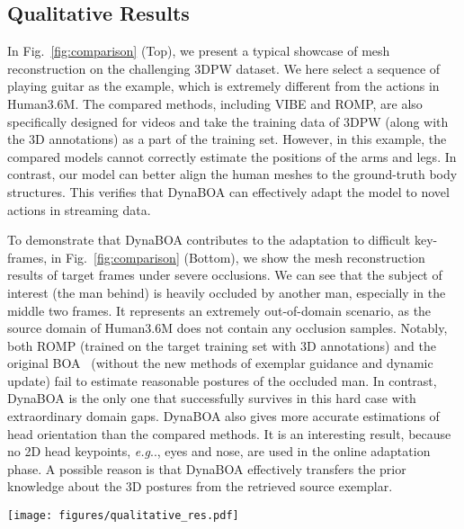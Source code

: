 \documentclass[10pt,journal,compsoc]{IEEEtran}
\makeatletter
\let\MYoriglatexcaption\caption
\renewcommand{\caption}[2][\relax]{\MYoriglatexcaption[#2]{#2}}
\DeclareRobustCommand\onedot{\futurelet\@let@token\@onedot}
\def\@onedot{\ifx\@let@token.\else.\null\fi\xspace}
\def\eg{\emph{e.g}\onedot} \def\Eg{\emph{E.g}\onedot}
\def\ie{\emph{i.e}\onedot} \def\Ie{\emph{I.e}\onedot}
\newcommand{\fig}[1]{Fig.~\ref{#1}}
\makeatother
\begin{document}
\subsection{Qualitative Results}

In \fig{fig:comparison} (Top), we present a typical showcase of mesh reconstruction on the challenging 3DPW dataset. We here select a sequence of playing guitar as the example, which is extremely different from the actions in Human3.6M. 
The compared methods, including VIBE and ROMP, are also specifically designed for videos and take the training data of 3DPW (along with the 3D annotations) as a part of the training set. 
However, in this example, the compared models cannot correctly estimate the positions of the arms and legs. In contrast, our model can better align the human meshes to the ground-truth body structures. 
This verifies that DynaBOA can effectively adapt the model to novel actions in streaming data. 


To demonstrate that DynaBOA contributes to the adaptation to difficult key-frames, in \fig{fig:comparison} (Bottom), we show the mesh reconstruction results of target frames under severe occlusions. We can see that the subject of interest (the man behind) is heavily occluded by another man, especially in the middle two frames.
It represents an extremely out-of-domain scenario, as the source domain of Human3.6M does not contain any occlusion samples. 
Notably, both ROMP (trained on the target training set with 3D annotations) and the original BOA~\cite{guan2021bilevel} (without the new methods of exemplar guidance and dynamic update) fail to estimate reasonable postures of the occluded man. 
In contrast, DynaBOA is the only one that successfully survives in this hard case with extraordinary domain gaps. 
DynaBOA also gives more accurate estimations of head orientation than the compared methods. It is an interesting result, because no 2D head keypoints, \eg, eyes and nose, are used in the online adaptation phase. A possible reason is that DynaBOA effectively transfers the prior knowledge about the 3D postures from the retrieved source exemplar. 








\begin{figure*}[!t]
    \centering
    \texttt{[image: figures/qualitative\_res.pdf]}
    \vspace{-15pt}
        \caption{\textbf{Top:} Qualitative showcases of mesh reconstruction on 3DPW streaming data, where the action of playing guitar is not included in the Human3.6M source domain. Note that VIBE and ROMP are specifically designed for videos, and they take the training data of 3DPW (along with the 3D annotations) as a part of the training set. We zoom in on the limbs for better visualization. \textbf{Bottom:} An example of mesh reconstruction under severe occlusion, in which the subject of interest (\ie, the man behind) is heavily occluded by another man. It is an extremely out-of-domain scenario because the source domain does not contain any occlusion samples.}
    \label{fig:comparison}
\end{figure*}
\end{document}
